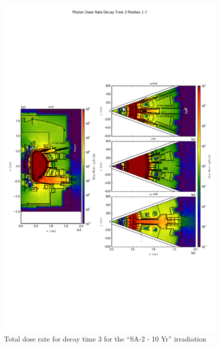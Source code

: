 \documentclass[12pt]{article}
\begin{document}
\begin{figure}[ht!]
\centering
\includegraphics[trim={0cm 8cm, 0cm 8cm},clip,scale=0.75]{../plots/final_model/5year/Photon_Dose_Rate_Decay_Time_3_Meshes_1-7.png}
\caption{Total dose rate for decay time 3 for the ``SA-2 - 10 Yr'' irradiation}
\label{fig:photons_5y_dc3_nob4c_dose}
\end{figure}
\end{document}
